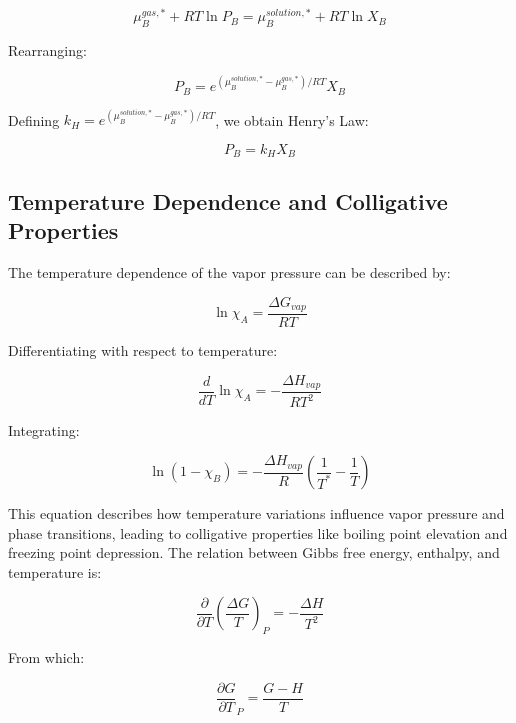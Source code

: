 \documentclass{article}
\theoremstyle{definition}
\begin{document}
\begin{equation}
\mu_B^{gas,*} + RT \ln P_B = \mu_B^{solution,*} + RT \ln X_B
\end{equation}

Rearranging:

\begin{equation}
P_B = e^{(\mu_B^{solution,*} - \mu_B^{gas,*}) / RT} X_B
\end{equation}

Defining $k_H = e^{(\mu_B^{solution,*} - \mu_B^{gas,*}) / RT}$, we obtain Henry’s Law:

\begin{equation}
P_B = k_H X_B
\end{equation}

\subsection{Temperature Dependence and Colligative Properties}

The temperature dependence of the vapor pressure can be described by:

\begin{equation}
\ln{\chi_A} = \frac{\Delta G_{vap}}{RT}
\end{equation}

Differentiating with respect to temperature:

\begin{equation}
\frac{d}{dT} \ln{\chi_A} = - \frac{\Delta H_{vap}}{RT^2}
\end{equation}

Integrating:

\begin{equation}
\ln(1 - \chi_B) = -\frac{\Delta H_{vap}}{R} \left( \frac{1}{T^*} - \frac{1}{T} \right)
\end{equation}

This equation describes how temperature variations influence vapor pressure and phase transitions, leading to colligative properties like boiling point elevation and freezing point depression. The relation between Gibbs free energy, enthalpy, and temperature is:

\begin{equation}
\frac{\partial}{\partial T} \left( \frac{\Delta G}{T} \right)_P = - \frac{\Delta H}{T^2}
\end{equation}

From which:

\begin{equation}
\frac{\partial G}{\partial T}_P = \frac{G - H}{T}
\end{equation}
\end{document}
